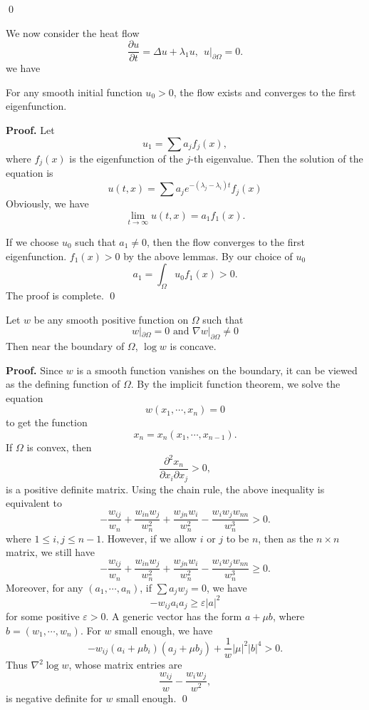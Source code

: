 \qed


We now consider the heat flow
\[
\frac{\partial u}{\partial t} = \Delta u + \lambda_1 u,
\ \ u|_{\partial\Omega} = 0.
\]
we have
\begin{lemma}
For any smooth initial function $u_0 > 0$, the flow exists and converges to the
first eigenfunction.
\end{lemma}
{\bf Proof.}
Let
\[
u_1 = \sum a_j f_j(x),
\]
where $f_j(x)$ is the eigenfunction of the $j$-th eigenvalue. Then the solution
of the equation is
\[
u(t, x) = \sum a_j e^{-(\lambda_j-\lambda_i)t}f_j(x)
\]
Obviously, we have
\[
\lim_{t\rightarrow\infty} u(t,x) = a_1 f_1(x).
\]

If we choose $u_0$ such that $a_1 \neq 0$, then the flow converges to the first
eigenfunction. $f_1(x) > 0$ by the above lemmas. By our choice of $u_0$
\[
a_1 = \int_{\Omega} u_0 f_1(x) > 0.
\]
The proof is complete.
\qed

\begin{lemma}
Let $w$ be any smooth positive function on $\Omega$ such that
\[
w|_{\partial\Omega} = 0 \mbox{ and } \nabla w|_{\partial\Omega} \neq 0
\]
Then near the boundary of $\Omega$, $\log w$ is concave.
\end{lemma}
{\bf Proof.}
Since $w$ is a smooth function vanishes on the boundary, it can be viewed as the
defining function of $\Omega$. By the implicit function theorem, we solve the
equation
\[
w(x_1, \cdots, x_n) = 0
\]
to get the function
\[
x_n = x_n(x_1, \cdots, x_{n-1}).
\]
If $\Omega$ is convex, then
\[
\frac{\partial^2 x_n}{\partial x_i \partial x_j} > 0,
\]
is a positive definite matrix. Using the chain rule, the above inequality is
equivalent to
\[
-\frac{w_{ij}}{w_n} + \frac{w_{in} w_j}{w_n^2} + \frac{w_{jn} w_i}{w_n^2}
-\frac{w_i w_j w_{nn}}{w_n^3} > 0.
\]
where $1\leqslant i, j \leqslant n-1$. However, if we allow $i$ or $j$ to be
$n$, then as the $n\times n$ matrix, we still have
\[
-\frac{w_{ij}}{w_n} + \frac{w_{in}w_j}{w_n^2} + \frac{w_{jn}w_i}{w_n^2}
-\frac{w_i w_j w_{nn}}{w_n^3} \geqslant 0.
\]
Moreover, for any $(a_1, \cdots, a_n)$, if $\sum a_j w_j = 0$, we have
\[
-w_{ij} a_i a_j \geqslant \varepsilon |a|^2
\]
for some positive $\varepsilon > 0$. A generic vector has the form $a+\mu b$,
where $b = (w_1, \cdots, w_n)$. For $w$ small enough, we have
\[
-w_{ij}(a_i + \mu b_i)(a_j + \mu b_j) + \frac{1}{w} |\mu|^2 |b|^4 > 0.
\]
Thus $\nabla^2\log w$, whose matrix entries are
\[
\frac{w_{ij}}{w} - \frac{w_i w_j}{w^2},
\]
is negative definite for $w$ small enough.
\qed


